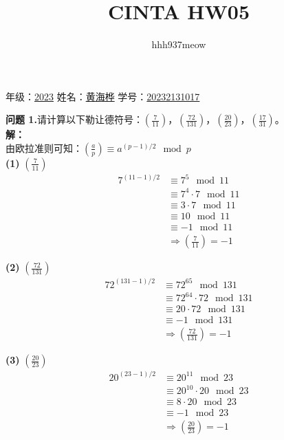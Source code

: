 \documentclass[a4paper]{CINTA}
\title{CINTA HW05}
\author{hhh937meow}
\begin{document}
\maketitle
\begin{center}
    年级：\underline{2023\hspace{1.5cm}} 
    姓名：\underline{黄海桦\hspace{1.5cm}} 
    学号：\underline{20232131017\hspace{1.5cm}} 
\end{center}

\textbf{问题 1.}请计算以下勒让德符号：$(\frac{7}{11})$，$(\frac{72}{131})$，$(\frac{20}{23})$，$(\frac{17}{31})$。\\
\textbf{解：}\\
由欧拉准则可知：$\left(\frac{a}{p}\right) \equiv a^{(p-1)/2} \mod p$\\
\textbf{(1)} $(\frac{7}{11})$\\
\begin{align*}
    7^{(11-1)/2} &\equiv 7^5 \mod 11\\
    &\equiv 7^4 \cdot 7 \mod 11\\
    &\equiv 3 \cdot 7 \mod 11\\
    &\equiv 10 \mod 11\\
    &\equiv -1 \mod 11\\
    &\Rightarrow (\frac{7}{11}) = -1
\end{align*}

\textbf{(2)} $(\frac{72}{131})$\\
\begin{align*}
    72^{(131-1)/2} &\equiv 72^{65} \mod 131\\
    &\equiv 72^{64} \cdot 72 \mod 131\\
    &\equiv 20 \cdot 72 \mod 131\\
    &\equiv -1 \mod 131\\
    &\Rightarrow (\frac{72}{131}) = -1
\end{align*}

\textbf{(3)} $(\frac{20}{23})$\\
\begin{align*}
    20^{(23-1)/2} &\equiv 20^{11} \mod 23\\
    &\equiv 20^{10} \cdot 20 \mod 23\\
    &\equiv 8 \cdot 20 \mod 23\\
    &\equiv -1 \mod 23\\
    &\Rightarrow (\frac{20}{23}) = -1
\end{align*}
\end{document}
